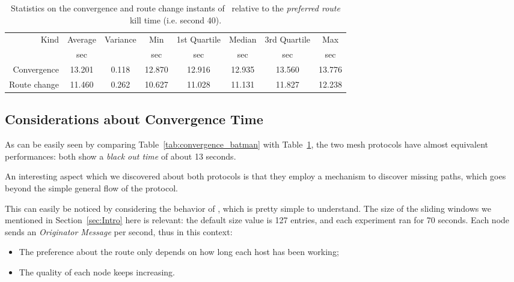        \begin{table}[htbp]
            \centering
            \begin{tabular}{rccccccc}
            \toprule
            Kind & Average & Variance & Min & 1st Quartile &
            Median & 3rd Quartile & Max \\
            & \footnotesize{sec} & & \footnotesize{sec} & \footnotesize{sec} &
            \footnotesize{sec} & \footnotesize{sec} & \footnotesize{sec} \\
            \midrule
            Convergence & 13.201 & 0.118 & 12.870 & 12.916 & 12.935 & 13.560 &13.776 \\
            Route change & 11.460 & 0.262 & 10.627 & 11.028 & 11.131 &11.827 & 12.238 \\
            \bottomrule
            \end{tabular}
            \caption{Statistics on the convergence and route change
              instants of \olsr\ relative to the \emph{preferred
                route} kill time (i.e. second 40).}
           \label{tab:convergence_olsr}
        \end{table}

\subsection{Considerations about Convergence Time}

    As can be easily seen by comparing Table~\ref{tab:convergence_batman}
    with Table~\ref{tab:convergence_olsr}, the two mesh protocols
    have almost equivalent performances: both show a
    \emph{black out time} of about 13 seconds.


    An interesting aspect which we discovered about both protocols is that
    they employ a mechanism to discover missing paths, which goes
    beyond the simple general flow of the protocol.

    This can easily be noticed by considering the behavior of \batman, which
    is pretty simple to understand. The size of the sliding windows we
    mentioned in Section~\ref{sec:Intro} here is relevant: the default size
    value is 127 entries, and each experiment ran for 70 seconds. Each node
    sends an \emph{Originator Message} per second, thus in this context:
    \begin{itemize}
    \item   The preference about the route only depends on how long each host
            has been working;
    \item   The quality of each node keeps increasing.
    \end{itemize}

